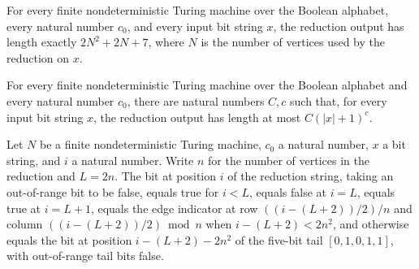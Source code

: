 \begin{lemma}
\label{Complexity.PathHard.length_red}
\leanok
{}
For every finite nondeterministic Turing machine over the Boolean alphabet, every
natural number $c_0$, and every input bit string $x$, the reduction output has length
exactly $2N^2+2N+7$, where $N$ is the number of vertices used by the reduction on $x$.
\end{lemma}

\begin{lemma}
\label{Complexity.PathHard.length_red_le}
\leanok
{}
For every finite nondeterministic Turing machine over the Boolean alphabet and every
natural number $c_0$, there are natural numbers $C,c$ such that, for every input bit
string $x$, the reduction output has length at most $C(|x|+1)^c$.
\end{lemma}

\begin{lemma}
\label{Complexity.PathHard.red_getD}
\leanok
{}
Let $N$ be a finite nondeterministic Turing machine, $c_0$ a natural number, $x$ a bit
string, and $i$ a natural number. Write $n$ for the number of vertices in the reduction
and $L=2n$. The bit at position $i$ of the reduction string, taking an out-of-range bit
to be false, equals true for $i<L$, equals false at $i=L$, equals true at $i=L+1$,
equals the edge indicator at row $((i-(L+2))/2)/n$ and column $((i-(L+2))/2)\bmod n$
when $i-(L+2)<2n^2$, and otherwise equals the bit at position $i-(L+2)-2n^2$ of the
five-bit tail $[0,1,0,1,1]$, with out-of-range tail bits false.
\end{lemma}
